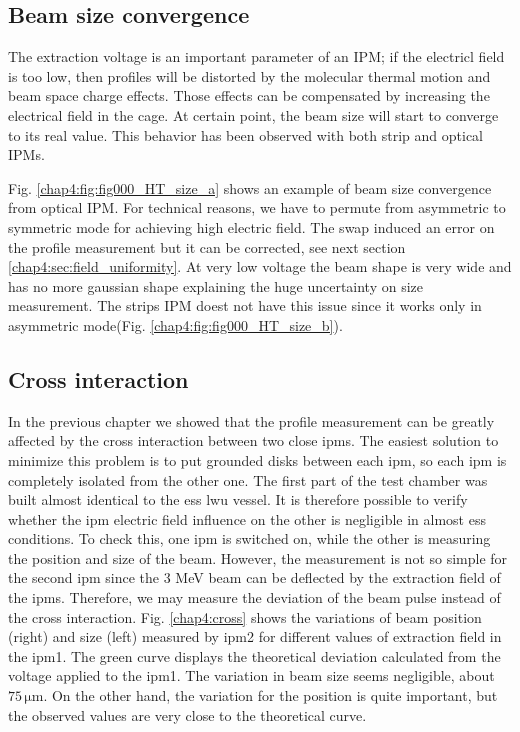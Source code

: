 \begin{refsection}
  \subsection{Beam size convergence}

  The extraction voltage is an important parameter of an IPM; if the electricl field is too low, then profiles will be distorted by the molecular thermal motion and beam space charge effects. Those effects can be compensated by increasing the electrical field in the cage. At certain point, the beam size will start to converge to its real value. This behavior has been observed with both strip and optical IPMs.

  Fig. \ref{chap4:fig:fig000_HT_size_a} shows an example of beam size convergence from optical IPM. For technical reasons, we have to permute from asymmetric to symmetric mode for achieving high electric field. The swap induced an error on the profile measurement but it can be corrected, see next section \ref{chap4:sec:field_uniformity}. At very low voltage the beam shape is very wide and has no more gaussian shape explaining the huge uncertainty on size measurement. The strips IPM doest not have this issue since it works only in asymmetric mode(Fig. \ref{chap4:fig:fig000_HT_size_b}).

  

  \subsection{Cross interaction }

  In the previous chapter we showed that the profile measurement can be greatly affected by the cross interaction between two close \acrshort{ipm}s. The easiest solution to minimize this problem is to put grounded disks between each \acrshort{ipm}, so each \acrshort{ipm} is completely isolated from the other one. The first part of the test chamber was built almost identical to the \acrshort{ess} \acrshort{lwu} vessel. It is therefore possible to verify whether the \acrshort{ipm} electric field influence on the other is negligible in almost \acrshort{ess} conditions. To check this, one \acrshort{ipm} is switched on, while the other is measuring the position and size of the beam. However, the measurement is not so simple for the second \acrshort{ipm} since the 3 MeV beam can be deflected by the extraction field of the \acrshort{ipm}s. Therefore, we may measure the deviation of the beam pulse instead of the cross interaction. Fig. \ref{chap4:cross} shows the variations of beam position (right) and size (left) measured by \acrshort{ipm}2 for different values of extraction field in the \acrshort{ipm}1. The green curve displays the theoretical deviation calculated from the voltage applied to the \acrshort{ipm}1. The variation in beam size seems negligible, about $75\,\mathrm{\mu m}$. On the other hand, the variation for the position is quite important, but the observed values are very close to the theoretical curve.


\end{refsection}
